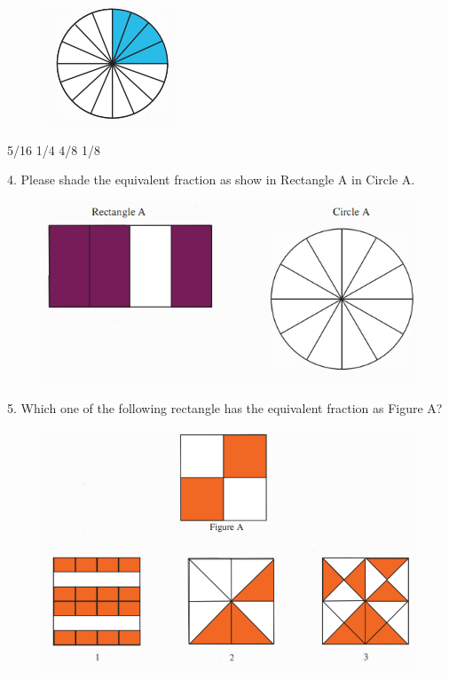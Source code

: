 \documentclass[11.5pt]{sig-alternate} %
\begin{document}
\begin{figure}[h]
    \centering
    \includegraphics[width=0.2\linewidth]{images/c3.png}
\end{figure}

5/16 1/4 4/8 1/8

4. Please shade the equivalent fraction as show in Rectangle A in Circle A.

\begin{figure}[h]
    \centering
    \includegraphics[width=0.5\linewidth]{images/c4.png}
\end{figure}

5. Which one of the following rectangle has the equivalent fraction as Figure A?

\begin{figure}[h]
    \centering
    \includegraphics[width=0.5\linewidth]{images/c5.png}
\end{figure}
\end{document}
